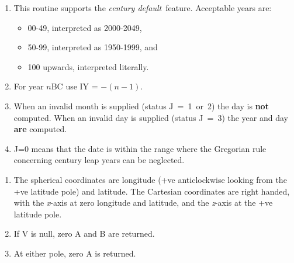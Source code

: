 \notes
{
 \begin{enumerate}
  \item This routine supports the {\it century default}\, feature.
        Acceptable years are:
        \begin{itemize}
         \item 00-49, interpreted as 2000-2049,
         \item 50-99, interpreted as 1950-1999, and
         \item 100 upwards, interpreted literally.
        \end{itemize}
  \item For year $n$BC use IY = $-(n-1)$.
  \item When an invalid month is supplied (status J~=~1~or~2)
        the day is {\bf not} computed.  When an invalid day is
        supplied (status J~=~3) the year and day {\bf are} computed.
  \item J=0 means that the date is within the range where the Gregorian
        rule concerning century leap years can be neglected.
 \end{enumerate}
}
{
}
{
}
{
}
\notes
{
 \begin{enumerate}
  \item The spherical coordinates are longitude (+ve anticlockwise
        looking from the +ve latitude pole) and latitude.  The
        Cartesian coordinates are right handed, with the {\it x}-axis
        at zero longitude and latitude, and the {\it z}-axis at the
        +ve latitude pole.
  \item If V is null, zero A and B are returned.
  \item At either pole, zero A is returned.
 \end{enumerate}
}
{
}
{
}
{
  \\
  \\
  \\
  \\
  \\
}
